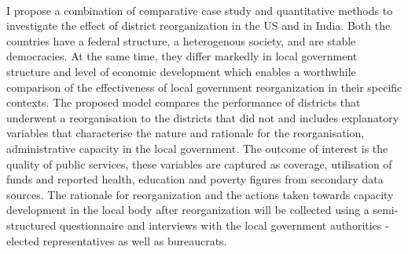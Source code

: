 \documentclass[12pt, a4paper]{article}
\begin{document}
	\paragraph{} I propose a combination of comparative case study and quantitative methods to investigate the effect of district reorganization in the US and in India. Both the countries have a federal structure, a heterogenous society, and are stable democracies. At the same time, they differ markedly in local government structure and level of economic development which enables a worthwhile comparison of the effectiveness of local government reorganization in their specific contexts. The proposed model compares the performance of districts that underwent a reorganisation to the districts that did not and includes explanatory variables that characterise the nature and rationale for the reorganisation, administrative capacity in the local government. The outcome of interest is the quality of public services, these variables are captured as coverage, utilisation of funds and reported health, education and poverty figures from secondary data sources. The rationale for reorganization and the actions taken towards capacity development in the local body after reorganization will be collected using a semi-structured questionnaire and interviews with the local government authorities - elected representatives as well as bureaucrats.
	
	\printbibliography
\end{document}
